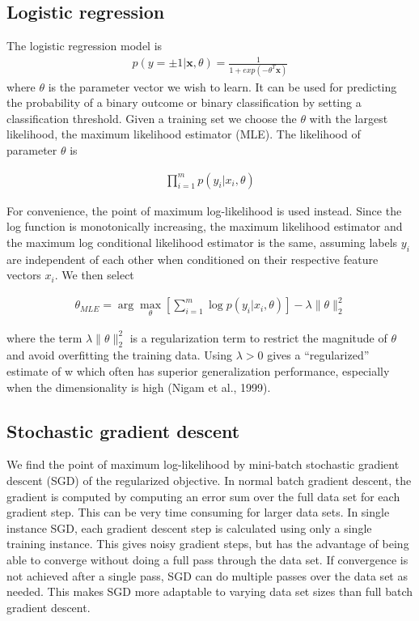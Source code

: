  \subsection{Logistic regression}
 The logistic regression model is
  \begin{eqnarray} 
 p(y = ±1|\textbf{x}, \theta) = \frac{1}{1 + exp( - \theta^T \textbf{x})}
  \end{eqnarray}
  where $\theta$ is the parameter vector we wish to learn.
 It can be used for predicting the probability of a binary outcome or binary classification by setting a classification threshold. Given a training set we choose the $\theta$ with the largest likelihood, the maximum likelihood estimator (MLE)\citep{elkan2014logreg}. The likelihood of parameter $\theta$ is
 
   \begin{eqnarray}
   \prod_{i=1}^{m} p(y_i | x_i,\theta)
   \end{eqnarray}
   
For convenience, the point of maximum log-likelihood is used instead. Since the log function is monotonically increasing, the maximum likelihood estimator and the maximum log conditional likelihood estimator is the same, assuming labels $y_i$ are independent of each other when conditioned on their respective feature vectors $x_i$. We then select

  \begin{eqnarray}
  \theta_{MLE} = \arg\max_\theta [\sum_{i=1}^{m} \log p(y_i | x_i,\theta)] - \lambda \|\theta\|^{2}_{2}
  \end{eqnarray}
  
where the term $\lambda\|\theta\|^{2}_{2}$ is a regularization term to restrict the magnitude of $\theta$ and avoid overfitting the training data. Using $\lambda > 0$ gives a “regularized” estimate of w which often has superior generalization performance, especially when the dimensionality is high (Nigam et al., 1999). 

\subsection{Stochastic gradient descent}
\label{sec:gradient_descent}
We find the point of maximum log-likelihood by mini-batch stochastic gradient descent (SGD) of the regularized objective. In normal batch gradient descent, the gradient is computed by computing an error sum over the full data set for each gradient step. This can be very time consuming for larger data sets. In single instance SGD, each gradient descent step is calculated using only a single training instance. This gives noisy gradient steps, but has the advantage of being able to converge without doing a full pass through the data set. If convergence is not achieved after a single pass, SGD can do multiple passes over the data set as needed. This makes SGD more adaptable to varying data set sizes than full batch gradient descent. 

